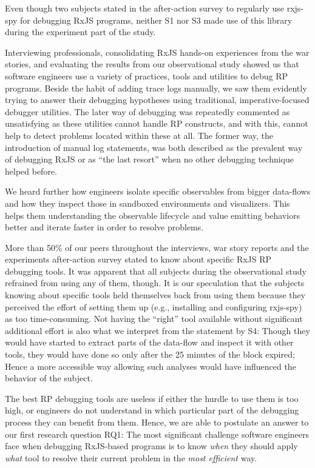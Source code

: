 \documentclass[sigplan,screen,review]{acmart}
\begin{document}
Even though two subjects stated in the after-action survey to regularly use rxjs-spy for debugging RxJS programs, neither S1 nor S3 made use of this library during the experiment part of the study.

Interviewing professionals, consolidating RxJS hands-on experiences from the war stories, and evaluating the results from our observational study showed us that software engineers use a variety of practices, tools and utilities to debug RP programs. Beside the habit of adding trace logs manually, we saw them evidently trying to answer their debugging hypotheses using traditional, imperative-focused debugger utilities. The later way of debugging was repeatedly commented as unsatisfying as these utilities cannot handle RP constructs, and with this, cannot help to detect problems located within these at all. The former way, the introduction of manual log statements, was both described as the prevalent way of debugging RxJS or as ``the last resort'' when no other debugging technique helped before.

We heard further how engineers isolate specific observables from bigger data-flows and how they inspect those in sandboxed environments and visualizers. This helps them understanding the observable lifecycle and value emitting behaviors better and iterate faster in order to resolve problems.

More than 50\% of our peers throughout the interviews, war story reports and the experiments after-action survey stated to know about specific RxJS RP debugging tools. It was apparent that all subjects during the observational study refrained from using any of them, though. It is our speculation that the subjects knowing about specific tools held themselves back from using them because they perceived the effort of setting them up (e.g., installing and configuring rxjs-spy) as too time-consuming. Not having the ``right'' tool available without significant additional effort is also what we interpret from the statement by S4: Though they would have started to extract parts of the data-flow and inspect it with other tools, they would have done so only after the 25 minutes of the block expired; Hence a more accessible way allowing such analyses would have influenced the behavior of the subject.

The best RP debugging tools are useless if either the hurdle to use them is too high, or engineers do not understand in which particular part of the debugging process they can benefit from them. Hence, we are able to postulate an answer to our first research question RQ1: The most significant challenge software engineers face when debugging RxJS-based programs is to know \emph{when} they should apply \emph{what} tool to resolve their current problem in the \emph{most efficient} way.
\end{document}
